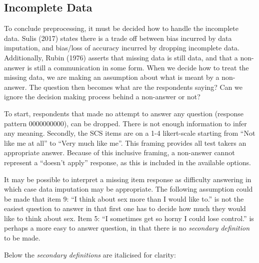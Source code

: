 \documentclass[
  man,floatsintext]{apa6}
\begin{document}
\hypertarget{incomplete-data}{%
\subsection{Incomplete Data}\label{incomplete-data}}

To conclude preprocessing, it must be decided how to handle the incomplete data. Sulis (2017) states there is a trade off between bias incurred by data imputation, and bias/loss of accuracy incurred by dropping incomplete data. Additionally, Rubin (1976) asserts that missing data is still data, and that a non-answer is still a communication in some form. When we decide how to treat the missing data, we are making an assumption about what is meant by a non-answer. The question then becomes what are the respondents saying? Can we ignore the decision making process behind a non-answer or not?

To start, respondents that made no attempt to answer any question (response pattern 0000000000), can be dropped. There is not enough information to infer any meaning. Secondly, the SCS items are on a 1-4 likert-scale starting from ``Not like me at all'' to ``Very much like me''. This framing provides all test takers an appropriate answer. Because of this inclusive framing, a non-answer cannot represent a ``doesn't apply'' response, as this is included in the available options.

It may be possible to interpret a missing item response as difficulty answering in which case data imputation may be appropriate. The following assumption could be made that item 9: ``I think about sex more than I would like to.'' is not the easiest question to answer in that first one has to decide how much they would like to think about sex. Item 5: ``I sometimes get so horny I could lose control.'' is perhaps a more easy to answer question, in that there is no \emph{secondary definition} to be made.

Below the \emph{secondary definitions} are italicised for clarity:
\tiny
\end{document}
